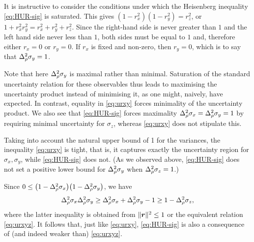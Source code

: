 It is instructive to consider the conditions under which the Heisenberg inequality \eqref{eq:HUR-sig} is saturated. This gives
$(1-r_x^2)(1-r_y^2)=r_z^2$, or $1+r_x^2r_y^2=r_x^2+r_y^2+r_z^2$. Since the right-hand side is never greater than $1$ and the left hand side never less than $1$, both sides must be equal to $1$ and, therefore either $r_x=0$ or $r_y=0$. If $r_x$ is fixed and  non-zero, then $r_y=0$, which is to say that $\varr{\sigma_y}=1$.

Note that here $\varr{\sigma_y}$  is maximal rather than minimal. Saturation of the standard uncertainty relation for these observables thus leads to maximising the uncertainty product instead of minimising it, as one might, naively, have expected. In contrast, equality in \eqref{eq:urxy} forces minimality of the uncertainty product. We also see that \eqref{eq:HUR-sig} forces maximality $\varr{\sigma_x}=\varr{\sigma_y}=1$ by requiring minimal uncertainty for $\sigma_z$, whereas \eqref{eq:urxy} does not stipulate this.

Taking into account the natural upper bound of 1 for the variances, the  inequality \eqref{eq:urxy} is tight, that is, it captures exactly the uncertainty region for $\sigma_x,\sigma_y$, while \eqref{eq:HUR-sig} does not. (As we observed above, \eqref{eq:HUR-sig} does not set a positive lower bound for $\varr{\sigma_y}$ when $\varr{\sigma_z}=1$.)

Since $0\le\bigl(1-\varr{\sigma_x}\bigr)\bigl(1-\varr{\sigma_y}\bigr)$, we have
\begin{equation}
  \varr{\sigma_x}\varr{\sigma_y}\ge \varr{\sigma_x}+\varr{\sigma_y}-1\ge1-\varr{\sigma_z},
\end{equation}
where the latter inequality is obtained from $\|\bm{r} \|^2\le 1$ or the equivalent relation \eqref{eq:urxyz}. It follows that, just like \eqref{eq:urxy}, \eqref{eq:HUR-sig} is also a consequence of (and indeed weaker than) \eqref{eq:urxyz}.


